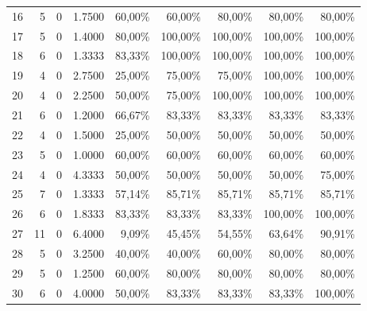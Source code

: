 \begin{table}[htbp]
{\begin{tabular}{r r r r r r r r r}
16 & 5 & 0 & 1.7500 & 60,00\% & 60,00\% & 80,00\% & 80,00\% & 80,00\% \\
17 & 5 & 0 & 1.4000 & 80,00\% & 100,00\% & 100,00\% & 100,00\% & 100,00\% \\
18 & 6 & 0 & 1.3333 & 83,33\% & 100,00\% & 100,00\% & 100,00\% & 100,00\% \\
19 & 4 & 0 & 2.7500 & 25,00\% & 75,00\% & 75,00\% & 100,00\% & 100,00\% \\
20 & 4 & 0 & 2.2500 & 50,00\% & 75,00\% & 100,00\% & 100,00\% & 100,00\% \\
21 & 6 & 0 & 1.2000 & 66,67\% & 83,33\% & 83,33\% & 83,33\% & 83,33\% \\
22 & 4 & 0 & 1.5000 & 25,00\% & 50,00\% & 50,00\% & 50,00\% & 50,00\% \\
23 & 5 & 0 & 1.0000 & 60,00\% & 60,00\% & 60,00\% & 60,00\% & 60,00\% \\
24 & 4 & 0 & 4.3333 & 50,00\% & 50,00\% & 50,00\% & 50,00\% & 75,00\% \\
25 & 7 & 0 & 1.3333 & 57,14\% & 85,71\% & 85,71\% & 85,71\% & 85,71\% \\
26 & 6 & 0 & 1.8333 & 83,33\% & 83,33\% & 83,33\% & 100,00\% & 100,00\% \\
27 & 11 & 0 & 6.4000 & 9,09\% & 45,45\% & 54,55\% & 63,64\% & 90,91\% \\
28 & 5 & 0 & 3.2500 & 40,00\% & 40,00\% & 60,00\% & 80,00\% & 80,00\% \\
29 & 5 & 0 & 1.2500 & 60,00\% & 80,00\% & 80,00\% & 80,00\% & 80,00\% \\
30 & 6 & 0 & 4.0000 & 50,00\% & 83,33\% & 83,33\% & 83,33\% & 100,00\% \\
\bottomrule
\end{tabular}
}
\end{table}

